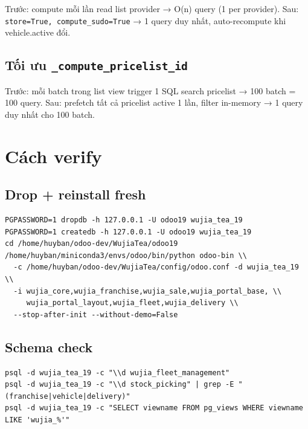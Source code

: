 Trước: compute mỗi lần read list provider → O(n) query (1 per provider). Sau: \texttt{store=True, compute\_sudo=True} → 1 query duy nhất, auto-recompute khi vehicle.active đổi.

\subsection{Tối ưu \texttt{\_compute\_pricelist\_id}}

Trước: mỗi batch trong list view trigger 1 SQL search pricelist → 100 batch = 100 query. Sau: prefetch tất cả pricelist active 1 lần, filter in-memory → 1 query duy nhất cho 100 batch.

\section{Cách verify}

\subsection{Drop + reinstall fresh}

\begin{lstlisting}[style=shell]
PGPASSWORD=1 dropdb -h 127.0.0.1 -U odoo19 wujia_tea_19
PGPASSWORD=1 createdb -h 127.0.0.1 -U odoo19 wujia_tea_19
cd /home/huyban/odoo-dev/WujiaTea/odoo19
/home/huyban/miniconda3/envs/odoo/bin/python odoo-bin \\
  -c /home/huyban/odoo-dev/WujiaTea/config/odoo.conf -d wujia_tea_19 \\
  -i wujia_core,wujia_franchise,wujia_sale,wujia_portal_base, \\
     wujia_portal_layout,wujia_fleet,wujia_delivery \\
  --stop-after-init --without-demo=False
\end{lstlisting}

\subsection{Schema check}

\begin{lstlisting}[style=shell]
psql -d wujia_tea_19 -c "\\d wujia_fleet_management"
psql -d wujia_tea_19 -c "\\d stock_picking" | grep -E "(franchise|vehicle|delivery)"
psql -d wujia_tea_19 -c "SELECT viewname FROM pg_views WHERE viewname LIKE 'wujia_%'"
\end{lstlisting}

